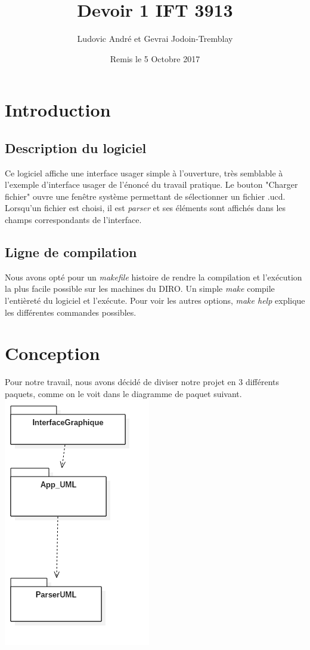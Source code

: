 \documentclass[letter,french]{report}
\begin{document}
	\title{Devoir 1 IFT 3913}
	\author{Ludovic André et Gevrai Jodoin-Tremblay}
	\date{Remis le 5 Octobre 2017}
	\maketitle
	
	\section*{Introduction}
	
	\subsection*{Description du logiciel}
	Ce logiciel affiche une interface usager simple à l'ouverture, très semblable
	à l'exemple d'interface usager de l'énoncé du travail pratique. Le bouton "Charger
	fichier" ouvre une fenêtre système permettant de sélectionner un fichier .ucd.
	Lorsqu'un fichier est choisi, il est \emph{parser} et ses éléments sont affichés dans
	les champs correspondants de l'interface.
	
	\subsection*{Ligne de compilation}
	Nous avons opté pour un \emph{makefile} histoire de rendre la compilation et l'exécution
	la plus facile possible sur les machines du DIRO. Un simple \emph{make} compile
	l'entièreté du logiciel et l'exécute. Pour voir les autres options, \emph{make help}
	explique les différentes commandes possibles.
	
	\section*{Conception}
	Pour notre travail, nous avons décidé de diviser notre projet en 3 différents
	paquets, comme on le voit dans le diagramme de paquet suivant.
	\newline 
	\includegraphics[scale=.3]{DiagrammePaquet.png}
	
\end{document}

